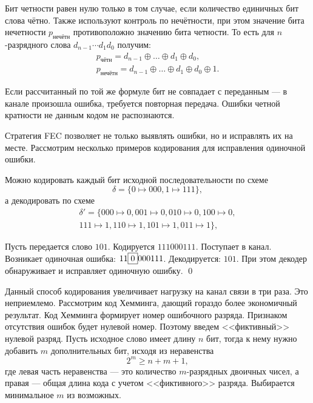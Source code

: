Бит четности равен нулю только в том случае, если количество единичных бит слова чётно. Также используют контроль по нечётности, при этом значение бита нечетности $p_{\text{нечётн}}$ противоположно значению бита четности. То есть для $n$-разрядного слова $d_{n-1}\cdots d_1d_0$ получим:
\[
    \begin{split}
        p_{\text{чётн}}=d_{n-1}\oplus\ldots\oplus d_1\oplus d_0,\\
        p_{\text{нечётн}}=d_{n-1}\oplus\ldots\oplus d_1\oplus d_0\oplus 1.
    \end{split}
\]

Если рассчитанный по той же формуле бит не совпадает с переданным --- в канале произошла ошибка, требуется повторная передача. Ошибки четной кратности не данным кодом не распознаются.

Стратегия FEC позволяет не только выявлять ошибки, но и исправлять их на месте. Рассмотрим несколько примеров кодирования для исправления одиночной ошибки.

Можно кодировать каждый бит исходной последовательности по схеме
\[\delta=\{0\mapsto 000,1\mapsto 111\},\]
а декодировать по схеме
\[
    \begin{split}
        \delta'=\{
            000\mapsto 0,001\mapsto 0,010\mapsto 0,100\mapsto 0,\\
            111\mapsto 1,110\mapsto 1,101\mapsto 1,011\mapsto 1
        \},
    \end{split}
\]

\begin{exampl}
Пусть передается слово $101$. Кодируется $111000111$. Поступает в канал. Возникает одиночная ошибка: $11\fbox{$0$}000111$. Декодируется: $101$. При этом декодер обнаруживает и исправляет одиночную ошибку. \qed
\end{exampl}

Данный способ кодирования увеличивает нагрузку на канал связи в три раза. Это неприемлемо. Рассмотрим код Хемминга, дающий гораздо более экономичный результат. Код Хемминга формирует номер ошибочного разряда. Признаком отсутствия ошибок будет нулевой номер. Поэтому введем <<фиктивный>> нулевой разряд. Пусть исходное слово имеет длину $n$ бит, тогда к нему нужно добавить $m$ дополнительных бит, исходя из неравенства
\begin{equation}
    \label{eq:code:hammingM}
    2^m\geq n + m + 1,
\end{equation}
где левая часть неравенства --- это количество $m$-разрядных двоичных чисел, а правая --- общая длина кода с учетом <<фиктивного>> разряда. Выбирается минимальное $m$ из возможных.

